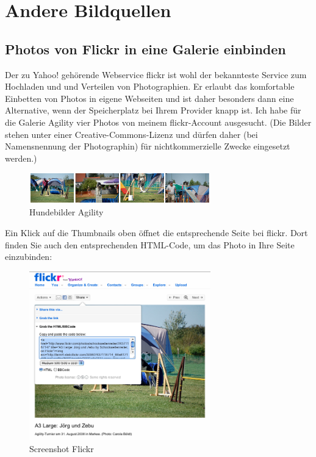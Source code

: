 \documentclass[11pt]{report}
\begin{document}
\section{Andere Bildquellen}
\label{sec-2-4-1}
\subsection{Photos von Flickr in eine Galerie einbinden}
\label{sec-2-4-1-1}


Der zu Yahoo! gehörende Webservice flickr ist wohl der bekannteste
Service zum Hochladen und und Verteilen von Photographien. Er erlaubt
das komfortable Einbetten von Photos in eigene Webseiten und ist daher
besonders dann eine Alternative, wenn der Speicherplatz bei Ihrem
Provider knapp ist. Ich habe für die Galerie Agility vier Photos von
meinem flickr-Account ausgesucht. (Die Bilder stehen unter einer
Creative-Commons-Lizenz und dürfen daher (bei Namensnennung der
Photographin) für nichtkommerzielle Zwecke eingesetzt werden.)

\begin{figure}[h!]
\centering
\includegraphics[width=0.7\textwidth]{./images/hundebilder03.png}
\caption{\label{hundebilder03}Hundebilder Agility}
\end{figure}

Ein Klick auf die Thumbnails oben öffnet die entsprechende Seite bei
flickr. Dort finden Sie auch den entsprechenden HTML-Code, um das
Photo in Ihre Seite einzubinden:

\begin{figure}[h!]
\centering
\includegraphics[width=0.7\textwidth]{./images/flickr01.png}
\caption{\label{flickr01}Screenshot Flickr}
\end{figure}
\end{document}
